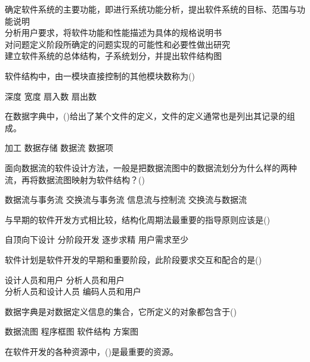 \documentclass[answers]{exam}
\begin{document}
\begin{questions}
	\begin{oneparchoices}
		\choice 确定软件系统的主要功能，即进行系统功能分析，提出软件系统的目标、范围与功能说明\\
		\choice 分析用户要求，将软件功能和性能描述为具体的规格说明书\\
		\choice 对问题定义阶段所确定的问题实现的可能性和必要性做出研究\\
		\correctchoice 建立软件系统的总体结构，子系统划分，并提出软件结构图
	\end{oneparchoices}
	\question 软件结构中，由一模块直接控制的其他模块数称为()\\
	\begin{oneparchoices}
		\choice 深度
		\choice 宽度
		\choice 扇入数
		\correctchoice 扇出数
	\end{oneparchoices}
	\question 在数据字典中，()给出了某个文件的定义，文件的定义通常也是列出其记录的组成。\\
	\begin{oneparchoices}
		\choice 加工
		\correctchoice 数据存储
		\choice 数据流
		\choice 数据项
	\end{oneparchoices}
	\question 面向数据流的软件设计方法，一般是把数据流图中的数据流划分为什么样的两种流，再将数据流图映射为软件结构？()\\
	\begin{oneparchoices}
		\choice 数据流与事务流
		\correctchoice 交换流与事务流
		\choice 信息流与控制流
		\choice 交换流与数据流
	\end{oneparchoices}
	\question 与早期的软件开发方式相比较，结构化周期法最重要的指导原则应该是()\\
	\begin{oneparchoices}
		\choice 自顶向下设计
		\correctchoice 分阶段开发
		\choice 逐步求精
		\choice 用户需求至少
	\end{oneparchoices}
	\question 软件计划是软件开发的早期和重要阶段，此阶段要求交互和配合的是()\\
	\begin{oneparchoices}
		\choice 设计人员和用户
		\correctchoice 分析人员和用户\\
		\choice 分析人员和设计人员
		\choice 编码人员和用户
	\end{oneparchoices}
	\question 数据字典是对数据定义信息的集合，它所定义的对象都包含于()\\
	\begin{oneparchoices}
		\correctchoice 数据流图
		\choice 程序框图
		\choice 软件结构
		\choice 方案图
	\end{oneparchoices}
	\question 在软件开发的各种资源中，()是最重要的资源。\\

\end{questions}
\end{document}
